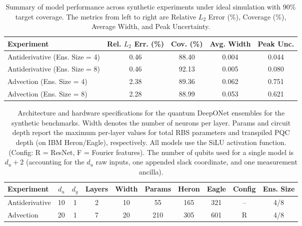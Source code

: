 \documentclass{iopjournal}
\begin{document}
\begin{table}[t]
\caption{Summary of model performance across synthetic experiments under ideal simulation with 90\% target coverage. The metrics from left to right are Relative $L_2$ Error (\%), Coverage (\%), Average Width, and Peak Uncertainty.}
\label{tab:results_summary_syn}
\begin{center}
\begin{tabular}{lcccc}
\hline
\textbf{Experiment} & \textbf{Rel. $L_2$ Err. (\%)} & \textbf{Cov. (\%)}  & \textbf{Avg. Width} & \textbf{Peak Unc.} \\
\hline

Antiderivative (Ens. Size = 4) & 0.46 & 88.40 & 0.004 & 0.044 \\
Antiderivative (Ens. Size = 8) & 0.46 & 92.13 & 0.005 & 0.080 \\
Advection (Ens. Size = 4)      & 2.38 & 89.36 & 0.062 & 0.751 \\
Advection (Ens. Size = 8)      & 2.28 & 88.99 & 0.053 & 0.621 \\

\hline
\end{tabular}
\end{center}
\end{table}

\begin{table}[t]
\caption{Architecture and hardware specifications for the quantum DeepONet ensembles for the synthetic benchmarks. Width denotes the number of neurons per layer. Params and circuit depth report the maximum per-layer values for total RBS parameters and transpiled PQC depth (on IBM Heron/Eagle), respectively. All models use the SiLU activation function. (Config: R = ResNet, F = Fourier features). The number of qubits used for a single model is $d_u + 2$ (accounting for the $d_u$ raw inputs, one appended slack coordinate, and one measurement ancilla).}
\label{tab:model_architectures_syn}
\begin{center}
\begin{tabular}{lccccccccc}
\hline
\textbf{Experiment} & $d_u$ & $d_y$ & \textbf{Layers} & \textbf{Width} & \textbf{Params} & \textbf{Heron} & \textbf{Eagle} & \textbf{Config} & \textbf{Ens. Size} \\
\hline 

Antiderivative & 10 & 1 & 2 & 10 & 55  & 165 & 321 & -- & 4/8 \\
Advection      & 20 & 1 & 7 & 20 & 210 & 305 & 601 & R  & 4/8 \\

 \hline
\end{tabular}
\end{center}
\end{table}
\end{document}
